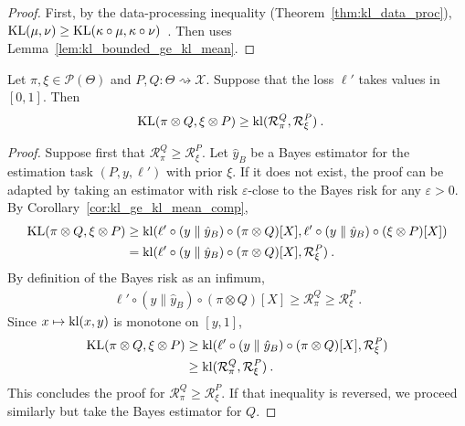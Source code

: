 \begin{proof}%
{}
First, by the data-processing inequality (Theorem~\ref{thm:kl_data_proc}),
$\operatorname{KL}(\mu, \nu) \ge \operatorname{KL}(\kappa \circ \mu, \kappa \circ \nu)$~.
Then uses Lemma~\ref{lem:kl_bounded_ge_kl_mean}.
\end{proof}


\begin{lemma}
  \label{lem:kl_estimation_ge}
  Let $\pi, \xi \in \mathcal P(\Theta)$ and $P, Q : \Theta \rightsquigarrow \mathcal X$. Suppose that the loss $\ell'$ takes values in $[0,1]$. Then
  \begin{align*}
  \operatorname{KL}(\pi \otimes Q, \xi \otimes P)
  &\ge \operatorname{kl}(\mathcal R_\pi^Q, \mathcal R_\xi^P)
  \: .
  \end{align*}
\end{lemma}

\begin{proof}%
{}
Suppose first that $\mathcal R_\pi^Q \ge \mathcal R_\xi^P$.
Let $\hat{y}_B$ be a Bayes estimator for the estimation task $(P, y, \ell')$ with prior $\xi$. If it does not exist, the proof can be adapted by taking an estimator with risk $\varepsilon$-close to the Bayes risk for any $\varepsilon > 0$.
By Corollary~\ref{cor:kl_ge_kl_mean_comp},
\begin{align*}
\operatorname{KL}(\pi \otimes Q, \xi \otimes P)
&\ge \operatorname{kl}(\ell' \circ (y \parallel \hat{y}_B) \circ (\pi \otimes Q) [X], \ell' \circ (y \parallel \hat{y}_B) \circ (\xi \otimes P) [X])
\\
&= \operatorname{kl}(\ell' \circ (y \parallel \hat{y}_B) \circ (\pi \otimes Q) [X], \mathcal R_\xi^P)
\: .
\end{align*}
By definition of the Bayes risk as an infimum,
\begin{align*}
\ell' \circ (y \parallel \hat{y}_B) \circ (\pi \otimes Q) [X]
\ge \mathcal R_\pi^Q
\ge \mathcal R_\xi^P
\: .
\end{align*}
Since $x \mapsto \operatorname{kl}(x, y)$ is monotone on $[y, 1]$,
\begin{align*}
\operatorname{KL}(\pi \otimes Q, \xi \otimes P)
&\ge \operatorname{kl}(\ell' \circ (y \parallel \hat{y}_B) \circ (\pi \otimes Q) [X], \mathcal R_\xi^P)
\\
&\ge \operatorname{kl}(\mathcal R_\pi^Q, \mathcal R_\xi^P)
\: .
\end{align*}
This concludes the proof for $\mathcal R_\pi^Q \ge \mathcal R_\xi^P$. If that inequality is reversed, we proceed similarly but take the Bayes estimator for $Q$.
\end{proof}


